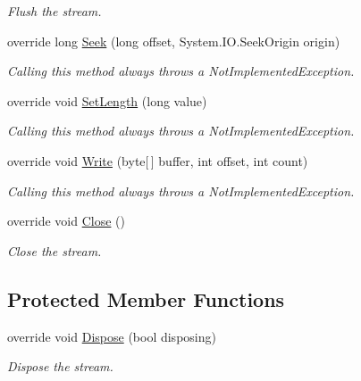 \begin{DoxyCompactItemize}
\begin{DoxyCompactList}\small\item\em Flush the stream. \end{DoxyCompactList}\item 
override long \mbox{\hyperlink{class_super_tiled2_unity_1_1_ionic_1_1_b_zip2_1_1_b_zip2_input_stream_a1093c240d12e5caec549b40f2e5b554b}{Seek}} (long offset, System.\+I\+O.\+Seek\+Origin origin)
\begin{DoxyCompactList}\small\item\em Calling this method always throws a Not\+Implemented\+Exception. \end{DoxyCompactList}\item 
override void \mbox{\hyperlink{class_super_tiled2_unity_1_1_ionic_1_1_b_zip2_1_1_b_zip2_input_stream_afbdeb8e88de09bd83c114d170a764bbe}{Set\+Length}} (long value)
\begin{DoxyCompactList}\small\item\em Calling this method always throws a Not\+Implemented\+Exception. \end{DoxyCompactList}\item 
override void \mbox{\hyperlink{class_super_tiled2_unity_1_1_ionic_1_1_b_zip2_1_1_b_zip2_input_stream_a607d195a539d84ae6d93f09d8a940316}{Write}} (byte\mbox{[}$\,$\mbox{]} buffer, int offset, int count)
\begin{DoxyCompactList}\small\item\em Calling this method always throws a Not\+Implemented\+Exception. \end{DoxyCompactList}\item 
override void \mbox{\hyperlink{class_super_tiled2_unity_1_1_ionic_1_1_b_zip2_1_1_b_zip2_input_stream_ac1509e6d87c88d921506ec4ff5417b78}{Close}} ()
\begin{DoxyCompactList}\small\item\em Close the stream. \end{DoxyCompactList}\end{DoxyCompactItemize}
\subsection*{Protected Member Functions}
\begin{DoxyCompactItemize}
\item 
override void \mbox{\hyperlink{class_super_tiled2_unity_1_1_ionic_1_1_b_zip2_1_1_b_zip2_input_stream_a3e9fb5055298ea3c4c224f97d3e68746}{Dispose}} (bool disposing)
\begin{DoxyCompactList}\small\item\em Dispose the stream. \end{DoxyCompactList}\end{DoxyCompactItemize}
